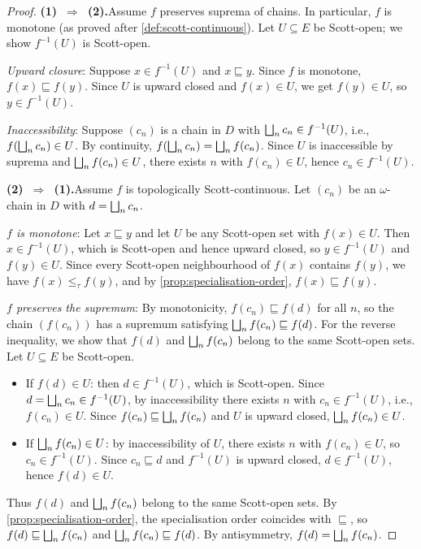 \begin{proof}
\textbf{(1)~$\Rightarrow$~(2).}\quad Assume $f$ preserves suprema of
chains. In particular, $f$ is monotone (as proved after
\cref{def:scott-continuous}). Let $U \subseteq E$ be Scott-open; we show
$f^{-1}(U)$ is Scott-open.

\emph{Upward closure}: Suppose $x \in f^{-1}(U)$ and
$x \sqsubseteq y$. Since $f$ is monotone, $f(x) \sqsubseteq f(y)$.
Since $U$ is upward closed and $f(x) \in U$, we get $f(y) \in U$, so
$y \in f^{-1}(U)$.

\emph{Inaccessibility}: Suppose $(c_n)$ is a chain in $D$ with
$\bigsqcup_n c_n \in f^{-1}(U)$, i.e., $f(\bigsqcup_n c_n) \in U$.  By
continuity, $f(\bigsqcup_n c_n) = \bigsqcup_n f(c_n)$.  Since $U$ is
inaccessible by suprema and $\bigsqcup_n f(c_n) \in U$, there exists $n$
with $f(c_n) \in U$, hence $c_n \in f^{-1}(U)$.

\medskip
\textbf{(2)~$\Rightarrow$~(1).}\quad Assume $f$ is topologically
Scott-continuous. Let $(c_n)$ be an $\omega$-chain in $D$ with
$d = \bigsqcup_n c_n$.

\emph{$f$ is monotone}: Let $x \sqsubseteq y$ and let $U$ be any
Scott-open set with $f(x) \in U$. Then $x \in f^{-1}(U)$, which is
Scott-open and hence upward closed, so $y \in f^{-1}(U)$ and
$f(y) \in U$. Since every Scott-open neighbourhood of $f(x)$ contains
$f(y)$, we have $f(x) \leq_\tau f(y)$, and by
\cref{prop:specialisation-order}, $f(x) \sqsubseteq f(y)$.

\emph{$f$ preserves the supremum}: By monotonicity, $f(c_n) \sqsubseteq
f(d)$ for all $n$, so the chain $(f(c_n))$ has a supremum satisfying
$\bigsqcup_n f(c_n) \sqsubseteq f(d)$. For the reverse inequality, we show
that $f(d)$ and $\bigsqcup_n f(c_n)$ belong to the same Scott-open sets.
Let $U \subseteq E$ be Scott-open.
\begin{itemize}
  \item If $f(d) \in U$: then $d \in f^{-1}(U)$, which is Scott-open.
        Since $d = \bigsqcup_n c_n \in f^{-1}(U)$, by inaccessibility there
        exists $n$ with $c_n \in f^{-1}(U)$, i.e., $f(c_n) \in U$.
        Since $f(c_n) \sqsubseteq \bigsqcup_n f(c_n)$ and $U$ is upward
        closed, $\bigsqcup_n f(c_n) \in U$.
  \item If $\bigsqcup_n f(c_n) \in U$: by inaccessibility of $U$, there
        exists $n$ with $f(c_n) \in U$, so $c_n \in f^{-1}(U)$.
        Since $c_n \sqsubseteq d$ and $f^{-1}(U)$ is upward closed,
        $d \in f^{-1}(U)$, hence $f(d) \in U$.
\end{itemize}
Thus $f(d)$ and $\bigsqcup_n f(c_n)$ belong to the same Scott-open sets.
By \cref{prop:specialisation-order}, the specialisation order coincides
with $\sqsubseteq$, so $f(d) \sqsubseteq \bigsqcup_n f(c_n)$ and
$\bigsqcup_n f(c_n) \sqsubseteq f(d)$. By antisymmetry,
$f(d) = \bigsqcup_n f(c_n)$.
\end{proof}

